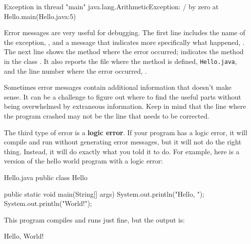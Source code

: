 \begin{small}
\begin{stdout}
Exception in thread "main" java.lang.ArithmeticException: / by zero
    at Hello.main(Hello.java:5)
\end{stdout}
\end{small}


Error messages are very useful for debugging.
The first line includes the name of the exception, , and a message that indicates more specifically what happened, .
The next line shows the method where the error occurred;  indicates the method  in the class .
It also reports the file where the method is defined, {\tt Hello.java}, and the line number where the error occurred, .

Sometimes error messages contain additional information that doesn't make sense.
It can be a challenge to figure out where to find the useful parts without being overwhelmed by extraneous information.
Keep in mind that the line where the program crashed may not be the line that needs to be corrected.



The third type of error is a {\bf logic error}.
If your program has a logic error, it will compile and run without generating error messages, but it will not do the right thing.
Instead, it will do exactly what you told it to do.
For example, here is a version of the hello world program with a logic error:


\begin{trinket}[235]{Hello.java}
public class Hello {

    public static void main(String[] args) {
        System.out.println("Hello, ");
        System.out.println("World!");
    }
}
\end{trinket}

This program compiles and runs just fine, but the output is:

\begin{stdout}
Hello,
World!
\end{stdout}

